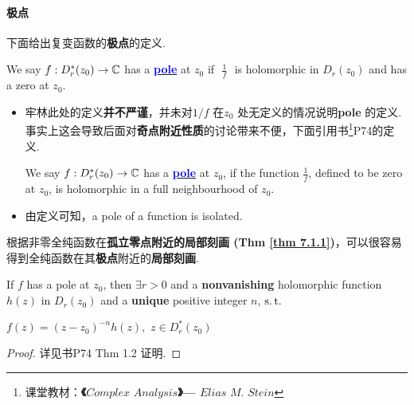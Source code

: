 \vspace{2em}
\paragraph{极点}
下面给出复变函数的\textbf{极点}的定义.
\begin{defn}\label{def 7.1.2}
	We say $f : D_{r}^{*}(z_0) \rightarrow \mathbb{C}$ has a \underline{\textcolor{blue}{\textbf{pole}}} at $z_0$ if $\,\, \frac{1}{f} \,\,$ is holomorphic in $D_{r}(z_0)$ and has a zero at $z_0$.
	
	\begin{rmk}
		\begin{itemize}
			\item 牢林此处的定义\textbf{并不严谨}，并未对$1 / f$ 在$z_0$ 处无定义的情况说明\textbf{pole} 的定义. 事实上这会导致后面对\textbf{奇点附近性质}的讨论带来不便，下面引用书\footnote{课堂教材：\textbf{《$Complex \,\, Analysis$》---  $Elias \,\, M. \,\, Stein$}}P74的定义.
			\begin{defn}\label{def 7.1.3}
				We say $f : D_{r}^{*}(z_0) \rightarrow \mathbb{C}$ has a \underline{\textcolor{blue}{\textbf{pole}}} at $z_0$, if the function $\frac{1}{f}$, defined to be zero at $z_0$, is holomorphic in a full neighbourhood of $z_0$.
			\end{defn}
			
			\vspace{1em}
			
			\item 由定义可知，a pole of a function is isolated.
		\end{itemize}
	\end{rmk}
\end{defn}

\vspace{2em}
根据非零全纯函数在\textbf{孤立零点附近的局部刻画 (Thm \ref{thm 7.1.1})}，可以很容易得到全纯函数在其\textbf{极点}附近的\textbf{局部刻画}.
\begin{thm}\label{thm 7.1.2}
	If $f$ has a pole at $z_0$, then $\exists r > 0$ and a \textbf{nonvanishing} holomorphic function $h(z)$ in $D_{r}(z_0)$ and a \textbf{unique} positive integer $n$, $\operatorname{s.t.}$
	\begin{center}
		$f(z) = (z - z_0)^{-n} h(z) , \,\, z \in D_{r}^{*}(z_0)$
	\end{center}
	
	\vspace{2em}
	\begin{proof}
		详见书P74 Thm 1.2 证明.
	\end{proof}
\end{thm}

